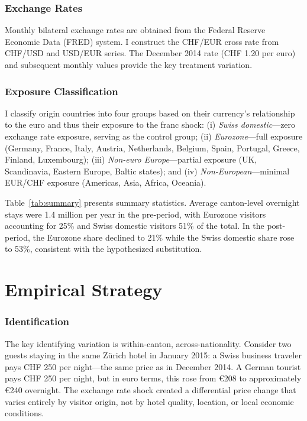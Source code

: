 \documentclass[12pt]{article}
\begin{document}
\subsubsection*{Exchange Rates} Monthly bilateral exchange rates are obtained from the Federal Reserve Economic Data (FRED) system. I construct the CHF/EUR cross rate from CHF/USD and USD/EUR series. The December 2014 rate (CHF 1.20 per euro) and subsequent monthly values provide the key treatment variation.

\subsubsection*{Exposure Classification} I classify origin countries into four groups based on their currency's relationship to the euro and thus their exposure to the franc shock: (i) \textit{Swiss domestic}---zero exchange rate exposure, serving as the control group; (ii) \textit{Eurozone}---full exposure (Germany, France, Italy, Austria, Netherlands, Belgium, Spain, Portugal, Greece, Finland, Luxembourg); (iii) \textit{Non-euro Europe}---partial exposure (UK, Scandinavia, Eastern Europe, Baltic states); and (iv) \textit{Non-European}---minimal EUR/CHF exposure (Americas, Asia, Africa, Oceania).



Table~\ref{tab:summary} presents summary statistics. Average canton-level overnight stays were 1.4 million per year in the pre-period, with Eurozone visitors accounting for 25\% and Swiss domestic visitors 51\% of the total. In the post-period, the Eurozone share declined to 21\% while the Swiss domestic share rose to 53\%, consistent with the hypothesized substitution.

\section{Empirical Strategy}

\subsubsection*{Identification} The key identifying variation is within-canton, across-nationality. Consider two guests staying in the same Zürich hotel in January 2015: a Swiss business traveler pays CHF 250 per night---the same price as in December 2014. A German tourist pays CHF 250 per night, but in euro terms, this rose from \euro{}208 to approximately \euro{}240 overnight. The exchange rate shock created a differential price change that varies entirely by visitor origin, not by hotel quality, location, or local economic conditions.
\end{document}
